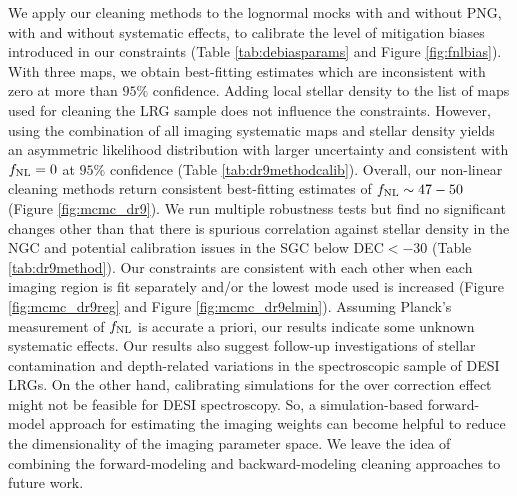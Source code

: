 We apply our cleaning methods to the lognormal mocks with and without PNG, with and without systematic effects, to calibrate the level of mitigation biases introduced in our constraints (Table \ref{tab:debiasparams} and Figure \ref{fig:fnlbias}). With three maps, we obtain best-fitting estimates which are inconsistent with zero at more than $95\%$ confidence. Adding local stellar density to the list of maps used for cleaning the LRG sample does not influence the constraints. However, using the combination of all imaging systematic maps and stellar density yields an asymmetric likelihood distribution with larger uncertainty and consistent with $f_{\rm NL}=0$ at $95\%$ confidence (Table \ref{tab:dr9methodcalib}).  Overall, our non-linear cleaning methods return consistent best-fitting estimates of $f_{\rm NL} \sim 47-50$ (Figure \ref{fig:mcmc_dr9}). We run multiple robustness tests but find no significant changes other than that there is spurious correlation against stellar density in the NGC and potential calibration issues in the SGC below DEC$< -30$ (Table \ref{tab:dr9method}). Our constraints are consistent with each other when each imaging region is fit separately and/or the lowest mode used is increased (Figure \ref{fig:mcmc_dr9reg} and Figure \ref{fig:mcmc_dr9elmin}). Assuming Planck's measurement of $f_{\rm NL}$ is accurate a priori, our results indicate some unknown systematic effects.  Our results also suggest follow-up investigations of stellar contamination and depth-related variations in the spectroscopic sample of DESI LRGs.  On the other hand, calibrating simulations for the over correction effect might not be feasible for DESI spectroscopy. So, a simulation-based forward-model approach for estimating the imaging weights can become helpful to reduce the dimensionality of the imaging parameter space. We leave the idea of combining the forward-modeling and backward-modeling cleaning approaches to future work. %